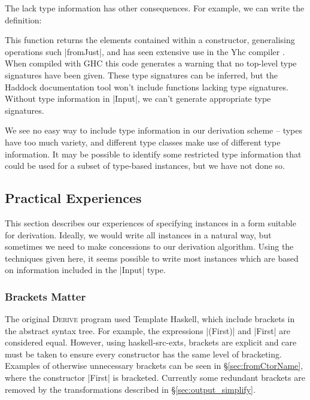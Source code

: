 \documentclass[preprint,draft]{sigplanconf}
\newcommand{\derive}{\textsc{Derive}}
\begin{document}
The lack type information has other consequences. For example, we can write the definition:


\noindent This function returns the elements contained within a constructor, generalising operations such |fromJust|, and has seen extensive use in the Yhc compiler \cite{yhc}. When compiled with GHC this code generates a warning that no top-level type signatures have been given. These type signatures can be inferred, but the Haddock documentation tool \cite{haddock} won't include functions lacking type signatures. Without type information in |Input|, we can't generate appropriate type signatures.

We see no easy way to include type information in our derivation scheme -- types have too much variety, and different type classes make use of different type information. It may be possible to identify some restricted type information that could be used for a subset of type-based instances, but we have not done so.

\subsection{Practical Experiences}

This section describes our experiences of specifying instances in a form suitable for derivation. Ideally, we would write all instances in a natural way, but sometimes we need to make concessions to our derivation algorithm. Using the techniques given here, it seems possible to write most instances which are based on information included in the |Input| type.

\subsubsection{Brackets Matter}

The original \derive{} program used Template Haskell, which include brackets in the abstract syntax tree. For example, the expressions |(First)| and |First| are considered equal. However, using haskell-src-exts, brackets are explicit and care must be taken to ensure every constructor has the same level of bracketing. Examples of otherwise unnecessary brackets can be seen in \S\ref{sec:fromCtorName}, where the constructor |First| is bracketed. Currently some redundant brackets are removed by the transformations described in \S\ref{sec:output_simplify}.
\end{document}
